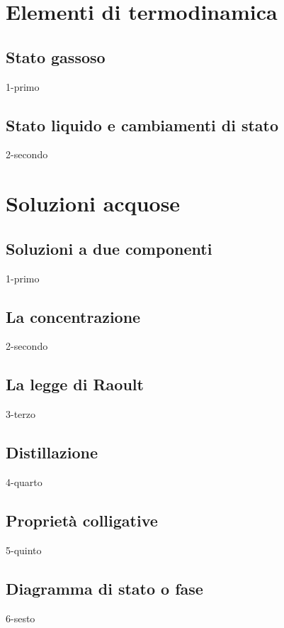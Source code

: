 \documentclass[openany,12pt]{book}%
\begin{document}
\chapter{Elementi di termodinamica}

  \section{Stato gassoso}
    {1-primo}

  \section{Stato liquido e cambiamenti di stato}
    {2-secondo}

\chapter{Soluzioni acquose}

  \section{Soluzioni a due componenti}
    {1-primo}

  \section{La concentrazione}
    {2-secondo}

  \section{La legge di Raoult}
    {3-terzo}

  \vspace{-0.3cm}\section{Distillazione}
  {4-quarto}

  \section{Proprietà colligative}
    {5-quinto}

    \newpage

  \section{Diagramma di stato o fase}
    {6-sesto}
\end{document}
